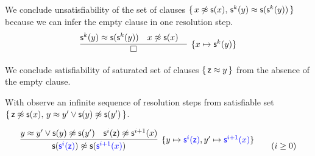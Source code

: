 \begin{example}
	We conclude unsatisfiability of the set of clauses
	$\{\,
	{ x\not\approx {\mathsf s}(x)},\, 
	{ {\mathsf s}^k(y)\approx {\mathsf s}({\mathsf s}^k(y))}
	\,\}$ 
	because we can infer the empty clause in one resolution step. 
	\begin{gather*}
	\infer[\{x\mapsto\msucc^k(y)\}]{
		\square
	}{
		{ \msucc^k(y)\mEQ \msucc(\msucc^k(y))} &
		{ x\mNE \msucc(x)} &
	}
	\end{gather*}
\end{example}


\begin{example}
	We conclude satisfiability of saturated set of clauses
	$\{\,{\mathsf z} \approx y\,\}$ 
	from the absence of the empty clause.
\end{example}

%	

\begin{example}\label{ex:sat:nezsx}
	With observe an infinite sequence of resolution steps from satisfiable set $\{\, 
	{\mathsf z}\not\approx{\mathsf s}(x),\, y\approx y' \lor {\mathsf s}(y)\not\approx{\mathsf s}(y')
	\,\}$.
	
	\begin{gather*}
	\infer
	[\{y\mapsto{\colN\msucc^i(\mzero)}, y'\mapsto{\colN\msucc^{i+1}(x)}\}]
	{
		\msucc({\colN\msucc^{i}(\mzero)})\mNE\msucc({\colN\msucc^{i+1}(x)}) 
	}{
		{y\mEQ y' \lor \msucc(y)\mNE\msucc(y')}
		&{ \msucc^i(\mzero)\mNE\msucc^{i+1}(x)}
	}
	\tag{$i\geq 0$}
	\end{gather*}
\end{example}

